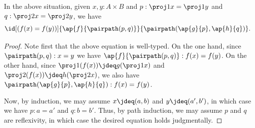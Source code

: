 %
\begin{thm}\label{thm:ap-prod}
  In the above situation, given $x,y:A\times B$ and $p:\proj1x=\proj1y$ and $q:\proj2x=\proj2y$, we have
  \[ \id[(f(x)=f(y))]{\ap{f}{\pairpath(p,q)}} {\pairpath(\ap{g}{p},\ap{h}{q})}. \]
\end{thm}

\begin{proof}
  Note first that the above equation is well-typed.
  On the one hand, since $\pairpath(p,q):x=y$ we have $\ap{f}{\pairpath(p,q)}:f(x)=f(y)$.
  On the other hand, since $\proj1(f(x))\jdeq g(\proj1x)$ and $\proj2(f(x))\jdeq h(\proj2x)$, we also have $\pairpath(\ap{g}{p},\ap{h}{q}):f(x)=f(y)$.

  Now, by induction, we may assume $x\jdeq(a,b)$ and $y\jdeq(a',b')$, in which case we have $p:a=a'$ and $q:b=b'$.
  Thus, by path induction, we may assume $p$ and $q$ are reflexivity, in which case the desired equation holds judgmentally.
\end{proof}
